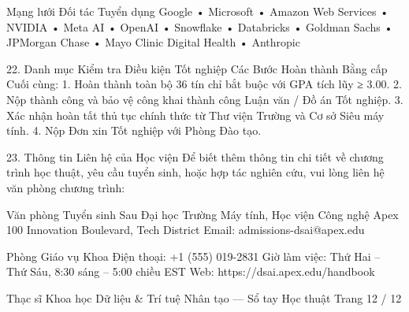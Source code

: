 \documentclass[12pt]{article}
\begin{document}
Mạng lưới Đối tác Tuyển dụng
Google • Microsoft • Amazon Web Services • NVIDIA • Meta AI • OpenAI • Snowflake • Databricks • Goldman Sachs • JPMorgan Chase • Mayo Clinic Digital Health • Anthropic

22. Danh mục Kiểm tra Điều kiện Tốt nghiệp
Các Bước Hoàn thành Bằng cấp Cuối cùng:
1. Hoàn thành toàn bộ 36 tín chỉ bắt buộc với GPA tích lũy ≥ 3.00.
2. Nộp thành công và bảo vệ công khai thành công Luận văn / Đồ án Tốt nghiệp.
3. Xác nhận hoàn tất thủ tục chính thức từ Thư viện Trường và Cơ sở Siêu máy tính.
4. Nộp Đơn xin Tốt nghiệp với Phòng Đào tạo.

23. Thông tin Liên hệ của Học viện
Để biết thêm thông tin chi tiết về chương trình học thuật, yêu cầu tuyển sinh, hoặc hợp tác nghiên cứu, vui lòng liên hệ văn phòng chương trình:

Văn phòng Tuyển sinh Sau Đại học
Trường Máy tính, Học viện Công nghệ Apex
100 Innovation Boulevard, Tech District
Email: admissions-dsai@apex.edu

Phòng Giáo vụ Khoa
Điện thoại: +1 (555) 019-2831
Giờ làm việc: Thứ Hai – Thứ Sáu, 8:30 sáng – 5:00 chiều EST
Web: https://dsai.apex.edu/handbook

Thạc sĩ Khoa học Dữ liệu \& Trí tuệ Nhân tạo — Sổ tay Học thuật
Trang 12 / 12
\end{document}
